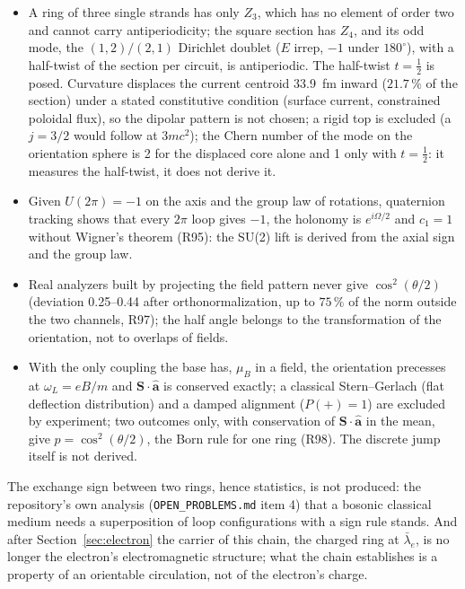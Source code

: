 \documentclass[11pt,a4paper]{article}
\theoremstyle{plain}
\theoremstyle{remark}
\newcommand{\lb}{\ensuremath{\bar\lambda_e}}
\begin{document}
\begin{itemize}[nosep]
\item A ring of three single strands has only $Z_3$, which has no element of order two and cannot
carry antiperiodicity; the square section has $Z_4$, and its odd mode, the $(1,2)/(2,1)$
Dirichlet doublet ($E$ irrep, $-1$ under $180^\circ$), with a half-twist of the section per
circuit, is antiperiodic. The half-twist $t = \tfrac12$ is posed. Curvature displaces the current
centroid 33.9~fm inward ($21.7\,\%$ of the section) under a stated constitutive condition (surface
current, constrained poloidal flux), so the dipolar pattern is not chosen; a rigid top is excluded
(a $j = 3/2$ would follow at $3mc^2$); the Chern number of the mode on the orientation sphere is 2
for the displaced core alone and 1 only with $t = \tfrac12$: it measures the half-twist, it does
not derive it.
\item Given $U(2\pi) = -1$ on the axis and the group law of rotations, quaternion tracking shows
that every $2\pi$ loop gives $-1$, the holonomy is $e^{i\Omega/2}$ and $c_1 = 1$ without Wigner's
theorem (R95): the SU(2) lift is derived from the axial sign and the group law.
\item Real analyzers built by projecting the field pattern never give $\cos^2(\theta/2)$
(deviation 0.25--0.44 after orthonormalization, up to $75\,\%$ of the norm outside the two channels,
R97); the half angle belongs to the transformation of the orientation, not to overlaps of fields.
\item With the only coupling the base has, $\mu_B$ in a field, the orientation precesses at
$\omega_L = eB/m$ and $\mathbf S\cdot\hat{\mathbf a}$ is conserved exactly; a classical
Stern--Gerlach (flat deflection distribution) and a damped alignment ($P(+) = 1$) are excluded by
experiment; two outcomes only, with conservation of $\mathbf S\cdot\hat{\mathbf a}$ in the mean,
give $p = \cos^2(\theta/2)$, the Born rule for one ring (R98). The discrete jump itself is not
derived.
\end{itemize}

The exchange sign between two rings, hence statistics, is not produced: the repository's own
analysis (\texttt{OPEN\_PROBLEMS.md} item 4) that a bosonic classical medium needs a superposition
of loop configurations with a sign rule stands. And after Section~\ref{sec:electron} the
carrier of this chain, the charged ring at $\lb$, is no longer the electron's electromagnetic
structure; what the chain establishes is a property of an orientable circulation, not of the
electron's charge.
\end{document}
